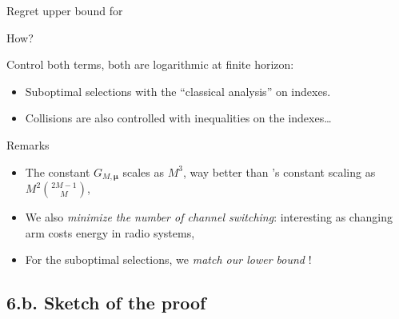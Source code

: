 \documentclass[12pt,english,ignorenonframetext,aspectratio=169,]{beamer}
\providecommand{\tightlist}{%
  \setlength{\itemsep}{0pt}\setlength{\parskip}{0pt}}
\begin{document}
\begin{frame}{Regret upper bound for \MCTopM{}}

\begin{block}{How?}

Control both terms, both are logarithmic at finite horizon:

\begin{itemize}
\tightlist
\item
  Suboptimal selections with the ``classical analysis'' on \klUCB{}
  indexes.
\item
  Collisions are also controlled with inequalities on the \klUCB{} indexes\ldots{}
\end{itemize}

\end{block}

\pause

\begin{block}{Remarks}

\begin{itemize}
\tightlist
\item
  The constant \(G_{M,\boldsymbol{\mu}}\) scales as \(M^3\), way better
  than \rhoRand's constant scaling as \(M^2 {2M-1 \choose M}\),
\item
  We also \emph{minimize the number of channel switching}: interesting
  as changing arm costs energy in radio systems,\pause
\item
  For the suboptimal selections, we \emph{match our lower bound} !
\end{itemize}

\end{block}

\end{frame}



\subsection{\hfill{}6.b. Sketch of the proof\hfill{}}
\end{document}
